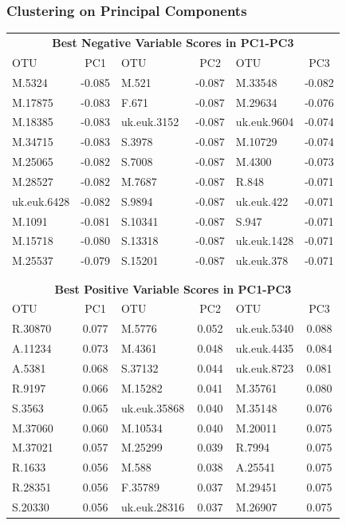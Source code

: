 \documentclass[10pt]{beamer}
\begin{document}
\begin{frame}[fragile]
\frametitle{Clustering on Principal Components}


{\scriptsize
\begin{center}
\begin{tabular}{lc|lc|lc}
\multicolumn{6}{c}{\bf Best Negative Variable Scores in PC1-PC3}\\
OTU	& PC1	  & OTU 	& PC2	        & OTU 	        & PC3\\ \hline
M.5324	& -0.085  & M.521	        & -0.087	& M.33548	& -0.082\\
M.17875	& -0.083  & F.671	        & -0.087	& M.29634	& -0.076\\
M.18385	& -0.083  & uk.euk.3152	& -0.087	& uk.euk.9604	& -0.074\\
M.34715	& -0.083  & S.3978	& -0.087	& M.10729	& -0.074\\
M.25065	& -0.082  & S.7008	& -0.087	& M.4300	& -0.073\\
M.28527	& -0.082  & M.7687	& -0.087	& R.848	        & -0.071\\
uk.euk.6428 & -0.082 & S.9894	& -0.087	& uk.euk.422	& -0.071\\
M.1091	& -0.081  & S.10341	& -0.087	& S.947	        & -0.071\\
M.15718	& -0.080  & S.13318	& -0.087	& uk.euk.1428	& -0.071\\
M.25537	& -0.079  & S.15201	& -0.087	& uk.euk.378	& -0.071\\ \hline
\multicolumn{6}{l}{ }\\					
\multicolumn{6}{l}{ }\\					
\multicolumn{6}{c}{\bf Best Positive Variable Scores in PC1-PC3}\\
OTU	& PC1	  & OTU 	& PC2	        & OTU 	        & PC3\\ \hline
R.30870	& 0.077	  & M.5776	& 0.052		& uk.euk.5340	& 0.088\\
A.11234	& 0.073	  & M.4361	& 0.048		& uk.euk.4435	& 0.084\\
A.5381	& 0.068	  & S.37132	& 0.044		& uk.euk.8723	& 0.081\\
R.9197	& 0.066	  & M.15282	& 0.041		& M.35761	& 0.080\\
S.3563	& 0.065	  & uk.euk.35868 & 0.040	& M.35148	& 0.076\\
M.37060	& 0.060	  & M.10534	& 0.040		& M.20011	& 0.075\\
M.37021	& 0.057	  & M.25299	& 0.039		& R.7994	& 0.075\\
R.1633	& 0.056	  & M.588	& 0.038		& A.25541	& 0.075\\
R.28351	& 0.056	  & F.35789	& 0.037		& M.29451	& 0.075\\
S.20330	& 0.056	  & uk.euk.28316 & 0.037	& M.26907	& 0.075\\ \hline
\end{tabular}
\end{center}
}
\end{frame}
\end{document}

